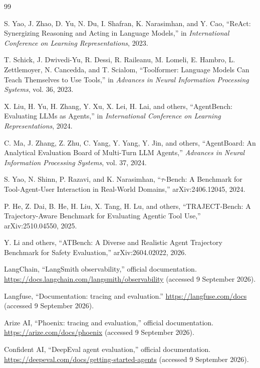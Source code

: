 \documentclass[preprint,12pt]{elsarticle}
\begin{document}
\footnotesize
\setlength{\parskip}{0pt}
\begin{thebibliography}{99}

S. Yao, J. Zhao, D. Yu, N. Du, I. Shafran, K. Narasimhan, and Y. Cao, ``ReAct: Synergizing Reasoning and Acting in Language Models,'' in \emph{International Conference on Learning Representations}, 2023.

T. Schick, J. Dwivedi-Yu, R. Dessi, R. Raileanu, M. Lomeli, E. Hambro, L. Zettlemoyer, N. Cancedda, and T. Scialom, ``Toolformer: Language Models Can Teach Themselves to Use Tools,'' in \emph{Advances in Neural Information Processing Systems}, vol. 36, 2023.

X. Liu, H. Yu, H. Zhang, Y. Xu, X. Lei, H. Lai, and others, ``AgentBench: Evaluating LLMs as Agents,'' in \emph{International Conference on Learning Representations}, 2024.

C. Ma, J. Zhang, Z. Zhu, C. Yang, Y. Yang, Y. Jin, and others, ``AgentBoard: An Analytical Evaluation Board of Multi-Turn LLM Agents,'' \emph{Advances in Neural Information Processing Systems}, vol. 37, 2024.

S. Yao, N. Shinn, P. Razavi, and K. Narasimhan, ``$\tau$-Bench: A Benchmark for Tool-Agent-User Interaction in Real-World Domains,'' arXiv:2406.12045, 2024.

P. He, Z. Dai, B. He, H. Liu, X. Tang, H. Lu, and others, ``TRAJECT-Bench: A Trajectory-Aware Benchmark for Evaluating Agentic Tool Use,'' arXiv:2510.04550, 2025.

Y. Li and others, ``ATBench: A Diverse and Realistic Agent Trajectory Benchmark for Safety Evaluation,'' arXiv:2604.02022, 2026.

LangChain, ``LangSmith observability,'' official documentation. \url{https://docs.langchain.com/langsmith/observability} (accessed 9 September 2026).

Langfuse, ``Documentation: tracing and evaluation.'' \url{https://langfuse.com/docs} (accessed 9 September 2026).

Arize AI, ``Phoenix: tracing and evaluation,'' official documentation. \url{https://arize.com/docs/phoenix} (accessed 9 September 2026).

Confident AI, ``DeepEval agent evaluation,'' official documentation. \url{https://deepeval.com/docs/getting-started-agents} (accessed 9 September 2026).


\end{thebibliography}
\end{document}
